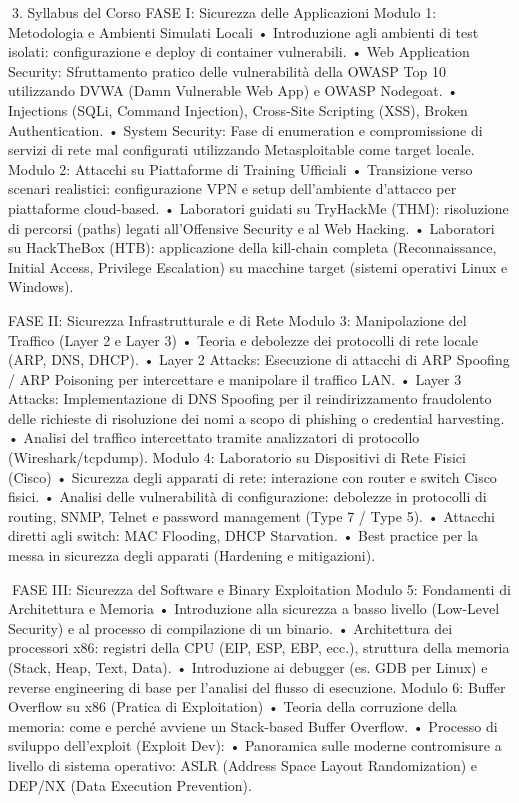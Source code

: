\documentclass[11pt,a4paper]{article}
\begin{document}
3. Syllabus del Corso FASE I: Sicurezza delle Applicazioni Modulo 1:
Metodologia e Ambienti Simulati Locali • Introduzione agli ambienti di
test isolati: configurazione e deploy di container vulnerabili. • Web
Application Security: Sfruttamento pratico delle vulnerabilità della
OWASP Top 10 utilizzando DVWA (Damn Vulnerable Web App) e OWASP
Nodegoat. • Injections (SQLi, Command Injection), Cross-Site Scripting
(XSS), Broken Authentication. • System Security: Fase di enumeration e
compromissione di servizi di rete mal configurati utilizzando
Metasploitable come target locale. Modulo 2: Attacchi su Piattaforme di
Training Ufficiali • Transizione verso scenari realistici:
configurazione VPN e setup dell'ambiente d'attacco per piattaforme
cloud-based. • Laboratori guidati su TryHackMe (THM): risoluzione di
percorsi (paths) legati all'Offensive Security e al Web Hacking. •
Laboratori su HackTheBox (HTB): applicazione della kill-chain completa
(Reconnaissance, Initial Access, Privilege Escalation) su macchine
target (sistemi operativi Linux e Windows).

FASE II: Sicurezza Infrastrutturale e di Rete Modulo 3: Manipolazione
del Traffico (Layer 2 e Layer 3) • Teoria e debolezze dei protocolli di
rete locale (ARP, DNS, DHCP). • Layer 2 Attacks: Esecuzione di attacchi
di ARP Spoofing / ARP Poisoning per intercettare e manipolare il
traffico LAN. • Layer 3 Attacks: Implementazione di DNS Spoofing per il
reindirizzamento fraudolento delle richieste di risoluzione dei nomi a
scopo di phishing o credential harvesting. • Analisi del traffico
intercettato tramite analizzatori di protocollo (Wireshark/tcpdump).
Modulo 4: Laboratorio su Dispositivi di Rete Fisici (Cisco) • Sicurezza
degli apparati di rete: interazione con router e switch Cisco fisici. •
Analisi delle vulnerabilità di configurazione: debolezze in protocolli
di routing, SNMP, Telnet e password management (Type 7 / Type 5). •
Attacchi diretti agli switch: MAC Flooding, DHCP Starvation. • Best
practice per la messa in sicurezza degli apparati (Hardening e
mitigazioni).

FASE III: Sicurezza del Software e Binary Exploitation Modulo 5:
Fondamenti di Architettura e Memoria • Introduzione alla sicurezza a
basso livello (Low-Level Security) e al processo di compilazione di un
binario. • Architettura dei processori x86: registri della CPU (EIP,
ESP, EBP, ecc.), struttura della memoria (Stack, Heap, Text, Data). •
Introduzione ai debugger (es. GDB per Linux) e reverse engineering di
base per l'analisi del flusso di esecuzione. Modulo 6: Buffer Overflow
su x86 (Pratica di Exploitation) • Teoria della corruzione della
memoria: come e perché avviene un Stack-based Buffer Overflow. •
Processo di sviluppo dell'exploit (Exploit Dev): • Panoramica sulle
moderne contromisure a livello di sistema operativo: ASLR (Address Space
Layout Randomization) e DEP/NX (Data Execution Prevention).


\end{document}
